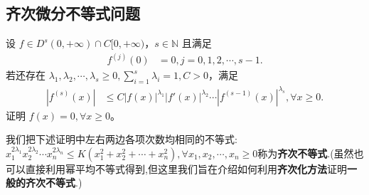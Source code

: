 \documentclass[../../main.tex]{subfiles}
\begin{document}
\subsection{齐次微分不等式问题}

\begin{proposition}\label{proposition:齐次化方法/关于导数乘积不等式问题}
设 $f \in D^s(0,+\infty) \cap C[0,+\infty)$，$s \in \mathbb{N}$ 且满足
\begin{align*}
f^{(j)}(0) &= 0, j = 0, 1, 2, \cdots, s - 1.
\end{align*}
若还存在 $\lambda_1, \lambda_2, \cdots, \lambda_s \geqslant  0, \sum_{i=1}^{s} \lambda_i = 1, C > 0$，满足
\begin{align}\label{example7.10-0.1}
\left| f^{(s)}(x) \right| &\leqslant  C \left| f(x) \right|^{\lambda_1} \left| f'(x) \right|^{\lambda_2} \cdots \left| f^{(s-1)}(x) \right|^{\lambda_s}, \forall x \geqslant  0.
\end{align}
证明 $f(x) = 0, \forall x \geqslant  0$。
\end{proposition}
\begin{note}
我们把下述证明中左右两边各项次数均相同的不等式:$x_{1}^{2\lambda _1}x_{2}^{2\lambda _2}\cdots x_{n}^{2\lambda _n}\leqslant K\left( x_{1}^{2}+x_{2}^{2}+\cdots +x_{n}^{2} \right) ,\forall x_1,x_2,\cdots ,x_n\geqslant 0$称为\textbf{齐次不等式}.(虽然也可以直接利用幂平均不等式得到,但这里我们旨在介绍如何利用\textbf{齐次化方法}证明\textbf{一般的齐次不等式}.)
\end{note}
\end{document}
